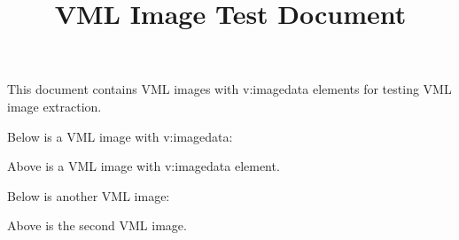 \documentclass[11pt,a4paper]{article}
\title{VML Image Test Document}
\begin{document}
\maketitle

This document contains VML images with v:imagedata elements for testing VML image extraction.

Below is a VML image with v:imagedata:

\begin{figure}[h]
\end{figure}

Above is a VML image with v:imagedata element.

Below is another VML image:

\begin{figure}[h]
\end{figure}

Above is the second VML image.
\end{document}
